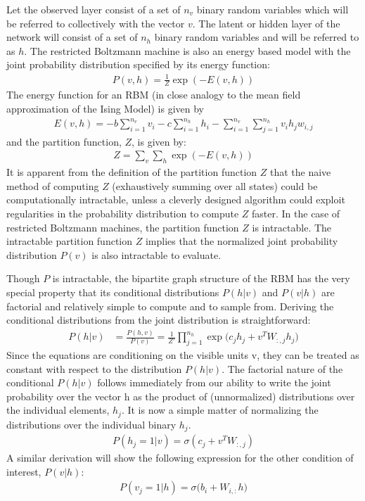 \documentclass[book.tex]{subfiles}
\begin{document}
Let the observed layer consist of a set of $n_v$ binary random variables which will be referred to collectively with the vector $v$. The latent or hidden layer of the network will consist of a set of $n_h$ binary random variables and will be referred to as $h$. The restricted Boltzmann machine is also an energy based model with the joint probability distribution specified by its energy function:
\begin{align}
P(v, h)=\frac{1}{Z}\exp(-E(v,h))
\end{align}
The energy function for an RBM (in close analogy to the mean field approximation of the Ising Model) is given by
\begin{align}
E(v,h)= -b\sum_{i=1}^{n_v} v_i -c\sum_{i=1}^{n_h} h_i - \sum_{i=1}^{n_v}\sum_{j=1}^{n_h} v_i h_j w_{i,j}
\end{align}
and the partition function, $Z$, is given by:
\begin{align}
Z=\sum_v \sum_h \exp\left(-E(v,h)\right)
\end{align}
It is apparent from the definition of the partition function $Z$ that the naive method of computing $Z$ (exhaustively summing over all states) could be computationally intractable, unless a cleverly designed algorithm could exploit regularities in the probability distribution to compute $Z$ faster. In the case of restricted Boltzmann machines, the partition function $Z$ is intractable. The intractable partition function $Z$ implies that the normalized joint probability distribution $P(v)$ is also intractable to evaluate.

Though $P$ is intractable, the bipartite graph structure of the RBM has the very special property that its conditional distributions $P(h|v)$ and $P(v|h)$ are factorial and relatively simple to compute and to sample from. Deriving the conditional distributions from the joint distribution is straightforward:
\begin{align}
P(h|v) &= \frac{P(h,v)}{P(v)} = \frac{1}{Z'}\prod^{n_h}_{j=1}\exp\Big(c_jh_j+v^TW_{:,j}h_j\Big)
\end{align}
Since the equations are conditioning on the visible units v, they can be treated as constant with respect to the distribution $P(h|v)$. The factorial nature of the conditional $P(h|v)$ follows immediately from our ability to write the joint probability over the vector h as the product of (unnormalized) distributions over the individual elements, $h_j$. It is now a simple matter of normalizing the distributions over the individual binary $h_j$.
\begin{align}
P(h_j=1|v)=\sigma(c_j+v^TW_{:,j})
\end{align}
A similar derivation will show the following expression for the other condition of interest, $P(v|h)$:
\begin{align}
P(v_j = 1|h)=\sigma\Big(b_i+W_{i,:}h\Big)
    \label{visible}
\end{align}
\end{document}
